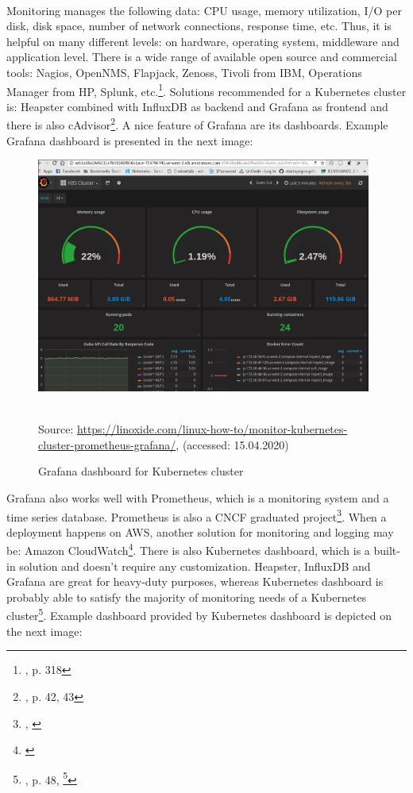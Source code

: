 \paragraph{}
Monitoring manages the following data: CPU usage, memory utilization, I/O per disk, disk space, number of network connections, response time, etc. Thus, it is helpful on many different levels: on hardware, operating system,  middleware and application level.
There is a wide range of available open source and commercial tools: Nagios, OpenNMS, Flapjack, Zenoss, Tivoli from IBM, Operations Manager from HP, Splunk, etc.\footnote{\cite{book-cicd}, p. 318}. Solutions recommended for a Kubernetes cluster is: Heapster combined with InfluxDB as backend and Grafana as frontend and there is also cAdvisor\footnote{\cite{book-mastering-k8s}, p. 42, 43}. A nice feature of Grafana are its dashboards. Example Grafana dashboard is presented in the next image:
\begin{figure}[H]
  \centering
  \includegraphics[width=11cm]{figures/grafana.png}
  \label{fig:grafana}
  \caption{Grafana dashboard for Kubernetes cluster}
  \\
  \small{Source: \url{https://linoxide.com/linux-how-to/monitor-kubernetes-cluster-prometheus-grafana/}, (accessed: 15.04.2020)}
\end{figure}
Grafana also works well with Prometheus, which is a monitoring system and a time series database. Prometheus is also a CNCF graduated project\footnote{\cite{online-prometheus-gh}, \cite{online-prometheus-www}}. When a deployment happens on AWS, another solution for monitoring and logging may be: Amazon CloudWatch\footnote{\cite{online-cw}}. There is also Kubernetes dashboard, which is a built-in solution and doesn't require any customization. Heapster, InfluxDB and Grafana are great for heavy-duty purposes, whereas Kubernetes dashboard is probably able to satisfy the majority of monitoring needs of a Kubernetes cluster\footnote{\cite{book-mastering-k8s}, p. 48, \footnote{\cite{book-devops-k8s}, p. 875, 879-882}}. Example dashboard provided by Kubernetes dashboard is depicted on the next image:
